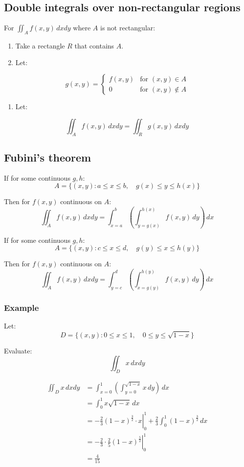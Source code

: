 \documentclass[11pt]{article}
\begin{document}
\subsection{Double integrals over non-rectangular regions}
\label{sec:orgc5a91b0}
For \(\iint_A f(x, y) \, dx dy\) where \(A\) is not rectangular:
\begin{enumerate}
\item Take a rectangle \(R\) that contains \(A\).
\item Let:
\end{enumerate}
\[
g(x, y) = \begin{cases}
f(x, y) & \text{for } (x, y) \in A \\
0 & \text{for } (x, y) \notin A
\end{cases}
\]
\begin{enumerate}
\item Let:
\end{enumerate}
\[\iint_A f(x, y) \, dx dy = \iint_R g(x, y) \, dx dy\]
\subsection{Fubini's theorem}
\label{sec:org59a8019}
If for some continuous \(g, h\):
\[A = \{(x, y) : a \le x \le b, \quad g(x) \le y \le h(x)\}\]

Then for \(f(x, y)\) continuous on \(A\):
\[\iint_A f(x, y) \, dx dy = \int_{x = a}^b \left( \int_{y = g(x)}^{h(x)} f(x, y) \, dy \right) \, dx\]

If for some continuous \(g, h\):
\[A = \{(x, y) : c \le x \le d, \quad g(y) \le x \le h(y)\}\]

Then for \(f(x, y)\) continuous on \(A\):
\[\iint_A f(x, y) \, dx dy = \int_{y = c}^d \left( \int_{x = g(y)}^{h(y)} f(x, y) \, dy \right) \, dx\]
\subsubsection{Example}
\label{sec:org3df784b}
Let:
\[D = \{(x, y) : 0 \le x \le 1, \quad 0 \le y \le \sqrt{1 - x}\}\]

Evaluate:
\[\iint_D x \, dx dy\]

\begin{align*}
\iint_D x \, dx dy &= \int_{x = 0}^1 \left( \int_{y = 0}^{\sqrt{1 - x}} x \, dy \right) \, dx \\
&= \int_0^1 x \sqrt{1 - x} \, dx \\
&= - \left. \frac{2}{3} (1 - x)^{\frac{3}{2}} \cdot x \right|_0^1 + \frac{2}{3} \int_0^1 (1 - x)^{\frac{3}{2}} \, dx \\
&= - \left. \frac{2}{3} \cdot \frac{2}{5} (1 - x)^{\frac{5}{2}} \right|_0^1 \\
&= \frac{4}{15}
\end{align*}
\end{document}
